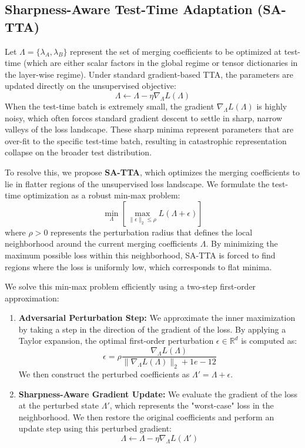 \documentclass{article}
\theoremstyle{plain}
\theoremstyle{definition}
\theoremstyle{remark}
\begin{document}
\subsection{Sharpness-Aware Test-Time Adaptation (SA-TTA)}
Let $\Lambda = \{\lambda_A, \lambda_B\}$ represent the set of merging coefficients to be optimized at test-time (which are either scalar factors in the global regime or tensor dictionaries in the layer-wise regime). Under standard gradient-based TTA, the parameters are updated directly on the unsupervised objective:
\begin{equation}
    \Lambda \leftarrow \Lambda - \eta \nabla_\Lambda L(\Lambda)
\end{equation}
When the test-time batch is extremely small, the gradient $\nabla_\Lambda L(\Lambda)$ is highly noisy, which often forces standard gradient descent to settle in sharp, narrow valleys of the loss landscape. These sharp minima represent parameters that are over-fit to the specific test-time batch, resulting in catastrophic representation collapse on the broader test distribution.

To resolve this, we propose \textbf{SA-TTA}, which optimizes the merging coefficients to lie in flatter regions of the unsupervised loss landscape. We formulate the test-time optimization as a robust min-max problem:
\begin{equation}
    \min_\Lambda \left[ \max_{\|\epsilon\|_2 \le \rho} L(\Lambda + \epsilon) \right]
\end{equation}
where $\rho > 0$ represents the perturbation radius that defines the local neighborhood around the current merging coefficients $\Lambda$. By minimizing the maximum possible loss within this neighborhood, SA-TTA is forced to find regions where the loss is uniformly low, which corresponds to flat minima.

We solve this min-max problem efficiently using a two-step first-order approximation:
\begin{enumerate}
    \item \textbf{Adversarial Perturbation Step:} We approximate the inner maximization by taking a step in the direction of the gradient of the loss. By applying a Taylor expansion, the optimal first-order perturbation $\epsilon \in \mathbb{R}^{d}$ is computed as:
    \begin{equation}
        \epsilon = \rho \frac{\nabla_\Lambda L(\Lambda)}{\|\nabla_\Lambda L(\Lambda)\|_2 + 1e-12}
    \end{equation}
    We then construct the perturbed coefficients as $\Lambda' = \Lambda + \epsilon$.
    \item \textbf{Sharpness-Aware Gradient Update:} We evaluate the gradient of the loss at the perturbed state $\Lambda'$, which represents the "worst-case" loss in the neighborhood. We then restore the original coefficients and perform an update step using this perturbed gradient:
    \begin{equation}
        \Lambda \leftarrow \Lambda - \eta \nabla_\Lambda L(\Lambda')
    \end{equation}
\end{enumerate}
\end{document}
